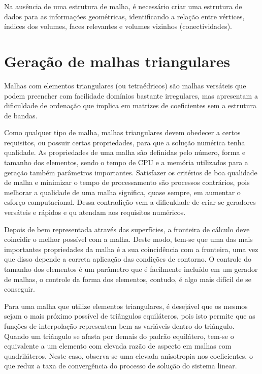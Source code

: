 Na ausência de uma estrutura de malha, é necessário criar uma estrutura de dados para as informações geométricas, identificando a relação entre vértices, índices dos volumes, faces relevantes e volumes vizinhos (conectividades).

\section{Geração de malhas triangulares}

Malhas com elementos triangulares (ou tetraédricos) são malhas versáteis que podem preencher com facilidade domínios bastante irregulares, mas apresentam a dificuldade de ordenação que implica em matrizes de coeficientes sem a estrutura de bandas.

Como qualquer tipo de malha, malhas triangulares devem obedecer a certos requisitos, ou possuir certas propriedades, para que a solução numérica tenha qualidade. As propriedades de uma malha são definidas pelo número, forma e tamanho dos elementos, sendo o tempo de CPU e a memória utilizados para a geração também parâmetros importantes. Satisfazer os critérios de boa qualidade de malha e minimizar o tempo de processamento são processos contrários, pois melhorar a qualidade de uma malha significa, quase sempre, em aumentar o esforço computacional. Dessa contradição vem a dificuldade de criar-se geradores versáteis e rápidos e qu atendam aos requisitos numéricos.

Depois de bem representada através das superfícies, a fronteira de cálculo deve coincidir o melhor possível com a malha. Deste modo, tem-se que uma das mais importantes propriedades da malha é a sua coincidência com a fronteira, uma vez que disso depende a correta aplicação das condições de contorno. O controle do tamanho dos elementos é um parâmetro que é facilmente incluído em um gerador de malhas, o controle da forma dos elementos, contudo, é algo mais difícil de se conseguir.

Para uma malha que utilize elementos triangulares, é desejável que os mesmos sejam o mais próximo possível de triângulos equiláteros, pois isto permite que as funções de interpolação representem bem as variáveis dentro do triângulo. Quando um triângulo se afasta por demais do padrão equilátero, tem-se o equivalente a um elemento com elevada razão de aspecto em malhas com quadriláteros. Neste caso, observa-se uma elevada anisotropia nos coeficientes, o que reduz a taxa de convergência do processo de solução do sistema linear.


